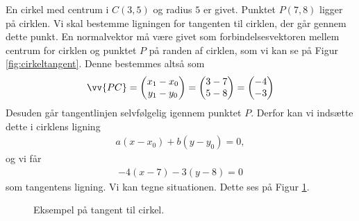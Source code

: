 \begin{exa}
	En cirkel med centrum i $C(3,5)$ og radius $5$ er givet. Punktet $P(7, 8)$ ligger på cirklen.
	Vi skal bestemme ligningen for tangenten til cirklen, der går gennem dette punkt. En normalvektor må være givet som
	forbindelsesvektoren mellem centrum for cirklen og punktet $P$ på randen af cirklen, som vi kan se på Figur
	 \ref{fig:cirkeltangent}. Denne bestemmes altså som
	\begin{align*}
		\vv{PC} = 
		\begin{pmatrix}
			x_1 - x_0 \\
			y_1 - y_0
		\end{pmatrix} 
		=
		\begin{pmatrix} 
			3 - 7 \\
			5 - 8
		\end{pmatrix}
		=
		\begin{pmatrix}
			-4 \\
			-3
		\end{pmatrix}
	\end{align*}
	Desuden går tangentlinjen selvfølgelig igennem punktet $P$. Derfor kan vi indsætte dette i cirklens ligning
	\begin{align*}
		a(x-x_0) + b(y-y_0)=0,
	\end{align*}
	og vi får
	\begin{align*}
		-4(x-7) -3(y-8) = 0
	\end{align*}
	som tangentens ligning. 
	Vi kan tegne situationen. Dette ses på Figur \ref{fig:ctexa}.
	\begin{figure}[H]
		\centering
		\caption{Eksempel på tangent til cirkel.}
		\label{fig:ctexa}
	\end{figure}
\end{exa}
